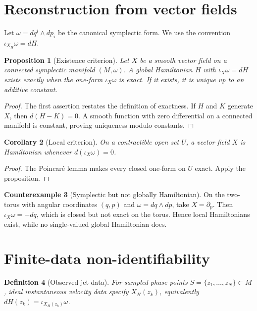 \documentclass[12pt]{article}
\newtheorem{definition}{Definition}[section]
\newtheorem{proposition}[definition]{Proposition}
\newtheorem{corollary}[definition]{Corollary}
\theoremstyle{definition}
\newtheorem{counterexample}[definition]{Counterexample}
\begin{document}
\section{Reconstruction from vector fields}
Let $\omega=dq^i\wedge dp_i$ be the canonical symplectic form. We use the convention $\iota_{X_H}\omega=dH$.

\begin{proposition}[Existence criterion]
Let $X$ be a smooth vector field on a connected symplectic manifold $(M,\omega)$. A global Hamiltonian $H$ with $\iota_X\omega=dH$ exists exactly when the one-form $\iota_X\omega$ is exact. If it exists, it is unique up to an additive constant.
\end{proposition}
\begin{proof}
The first assertion restates the definition of exactness. If $H$ and $K$ generate $X$, then $d(H-K)=0$. A smooth function with zero differential on a connected manifold is constant, proving uniqueness modulo constants.
\end{proof}

\begin{corollary}[Local criterion]
On a contractible open set $U$, a vector field $X$ is Hamiltonian whenever $d(\iota_X\omega)=0$.
\end{corollary}
\begin{proof}
The Poincar\'e lemma makes every closed one-form on $U$ exact. Apply the proposition.
\end{proof}

\begin{counterexample}[Symplectic but not globally Hamiltonian]
On the two-torus with angular coordinates $(q,p)$ and $\omega=dq\wedge dp$, take $X=\partial_p$. Then $\iota_X\omega=-dq$, which is closed but not exact on the torus. Hence local Hamiltonians exist, while no single-valued global Hamiltonian does.
\end{counterexample}

\section{Finite-data non-identifiability}
\begin{definition}[Observed jet data]
For sampled phase points $S=\{z_1,\ldots,z_N\}\subset M$, ideal instantaneous velocity data specify $X_H(z_k)$, equivalently $dH(z_k)=\iota_{X_H(z_k)}\omega$.
\end{definition}
\end{document}
